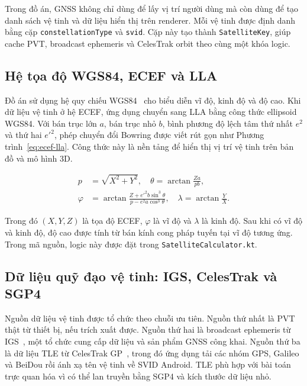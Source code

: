 \documentclass[../DoAn.tex]{subfiles}
\begin{document}
Trong đồ án, GNSS không chỉ dùng để lấy vị trí người dùng mà còn dùng để tạo danh sách vệ tinh và dữ liệu hiển thị trên renderer. Mỗi vệ tinh được định danh bằng cặp \texttt{constellationType} và \texttt{svid}. Cặp này tạo thành \texttt{SatelliteKey}, giúp cache PVT, broadcast ephemeris và CelesTrak orbit theo cùng một khóa logic.

\subsection{Hệ tọa độ WGS84, ECEF và LLA}
\label{subsection:3.2.2}
Đồ án sử dụng hệ quy chiếu WGS84~\cite{wgs84-tr8350} cho biểu diễn vĩ độ, kinh độ và độ cao. Khi dữ liệu vệ tinh ở hệ ECEF, ứng dụng chuyển sang LLA bằng công thức ellipsoid WGS84. Với bán trục lớn $a$, bán trục nhỏ $b$, bình phương độ lệch tâm thứ nhất $e^2$ và thứ hai $e'^2$, phép chuyển đổi Bowring được viết rút gọn như Phương trình~\ref{eq:ecef-lla}. Công thức này là nền tảng để hiển thị vị trí vệ tinh trên bản đồ và mô hình 3D.

\begin{equation}
\label{eq:ecef-lla}
\begin{split}
p &= \sqrt{X^2 + Y^2},\quad
\theta = \arctan\frac{Z a}{p b},\\
\varphi &= \arctan\frac{Z + e'^2 b \sin^3\theta}{p - e^2 a \cos^3\theta},\quad
\lambda = \arctan\frac{Y}{X}.
\end{split}
\end{equation}

Trong đó $(X,Y,Z)$ là tọa độ ECEF, $\varphi$ là vĩ độ và $\lambda$ là kinh độ. Sau khi có vĩ độ và kinh độ, độ cao được tính từ bán kính cong pháp tuyến tại vĩ độ tương ứng. Trong mã nguồn, logic này được đặt trong \texttt{SatelliteCalculator.kt}.

\subsection{Dữ liệu quỹ đạo vệ tinh: IGS, CelesTrak và SGP4}
\label{subsection:3.2.3}
Nguồn dữ liệu vệ tinh được tổ chức theo chuỗi ưu tiên. Nguồn thứ nhất là PVT thật từ thiết bị, nếu trích xuất được. Nguồn thứ hai là broadcast ephemeris từ IGS~\cite{igs-products}, một tổ chức cung cấp dữ liệu và sản phẩm GNSS công khai. Nguồn thứ ba là dữ liệu TLE từ CelesTrak GP~\cite{celestrak-gp-data,ccsds-omm}, trong đó ứng dụng tải các nhóm GPS, Galileo và BeiDou rồi ánh xạ tên vệ tinh về SVID Android. TLE phù hợp với bài toán trực quan hóa vì có thể lan truyền bằng SGP4 và kích thước dữ liệu nhỏ.
\end{document}
